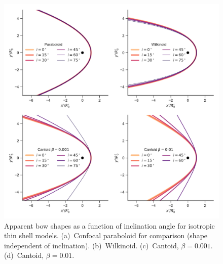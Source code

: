 \begin{figure}
  \centering
  \includegraphics[width=\linewidth]{figs/test_xyprime}
  \caption{Apparent bow shapes as a function of inclination angle for
    isotropic thin shell models. (a)~Confocal paraboloid for
    comparison (shape independent of inclination).
    (b)~Wilkinoid. (c)~Cantoid, \(\beta = 0.001\). (d)~Cantoid,
    \(\beta = 0.01\). }
  \label{fig:xyprime}
\end{figure}

